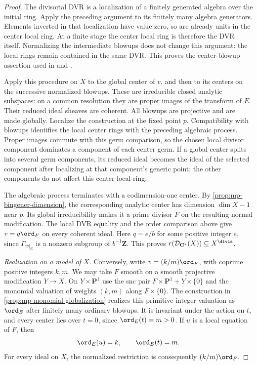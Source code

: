 \begin{proof}
The divisorial DVR is a localization of a finitely generated
algebra over the initial ring. Apply the preceding argument to
its finitely many algebra generators. Elements inverted in that
localization have value zero, so are already units in the center
local ring. At a finite stage the center local ring is therefore
the DVR itself. Normalizing the intermediate blowups does not
change this argument: the local rings remain contained in the
same DVR. This proves the center-blowup assertion used in
\cite[Lemma~2.5.9]{MPTropicalV2} and
\cite[proof of Lemma~4.7]{BHJ17}.

Apply this procedure on $X$ to the global center of $v$, and
then to its centers on the successive normalized blowups.
These are irreducible closed analytic subspaces: on a common
resolution they are proper images of the transform of $E$.
Their reduced ideal sheaves are coherent. All blowups are
projective and are made globally. Localize the construction at
the fixed point $p$. Compatibility with blowups identifies the
local center rings with the preceding algebraic process.
Proper images commute with this germ comparison, so the chosen
local divisor component dominates a component of each center
germ. If a global center splits into several germ components, its reduced
ideal becomes the ideal of the selected component after
localizing at that component's generic point; the other
components do not affect this center local ring.

The algebraic process terminates with a codimension-one center.
By \cref{prop:mp-bingener-dimension}, the corresponding analytic
center has dimension $\dim X-1$ near $p$. Its global
irreducibility makes it a prime divisor $F$ on the resulting
normal modification. The local DVR equality and the order
comparison above give $v=q\ord_F$ on every coherent ideal.
Here $q=e/b$ for some positive integer $e$, since
$\Gamma_{w|_K}$ is a nonzero subgroup of $b^{-1}\mathbf Z$.
This proves
$r(\mathcal D_{\mathbf C^*}(X))\subseteq X^{\divis}$.

\emph{Realization on a model of $X$.}
Conversely, write $v=(k/m)\ord_F$, with coprime positive
integers $k,m$. We may take $F$ smooth on a smooth projective
modification $Y\to X$. On $Y\times\mathbf P^1$ use the snc
pair $F\times\mathbf P^1+Y\times\{0\}$ and the monomial
valuation of weights $(k,m)$ along $F\times\{0\}$.
The construction in \cref{prop:mp-monomial-globalization}
realizes this primitive integer valuation as $\ord_E$ after
finitely many ordinary blowups. It is invariant under the action
on $t$, and every center lies over $t=0$, since $\ord_E(t)=m>0$.
If $u$ is a local equation of $F$, then
\[
                 \ord_E(u)=k,\qquad \ord_E(t)=m.
\]
For every ideal on $X$, the normalized restriction is consequently
$(k/m)\ord_F$.


\end{proof}
